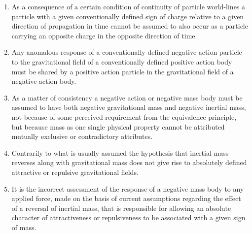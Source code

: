 \documentclass[notitlepage,12pt]{report}
\begin{document}
\begin{enumerate}
\item As a consequence of a certain condition of continuity of particle world-lines a particle with a given conventionally defined sign of charge relative to a given direction of propagation in time cannot be assumed to also occur as a particle carrying an opposite charge in the opposite direction of time.

\item Any anomalous response of a conventionally defined negative action particle to the gravitational field of a conventionally defined positive action body must be shared by a positive action particle in the gravitational field of a negative action body.

\item As a matter of consistency a negative action or negative mass body must be assumed to have both negative gravitational mass and negative inertial mass, not because of some perceived requirement from the equivalence principle, but because mass as one single physical property cannot be attributed mutually exclusive or contradictory attributes.

\item Contrarily to what is usually assumed the hypothesis that inertial mass reverses along with gravitational mass does not give rise to absolutely defined attractive or repulsive gravitational fields.

\item It is the incorrect assessment of the response of a negative mass body to any applied force, made on the basis of current assumptions regarding the effect of a reversal of inertial mass, that is responsible for allowing an absolute character of attractiveness or repulsiveness to be associated with a given sign of mass.


\end{enumerate}
\end{document}
